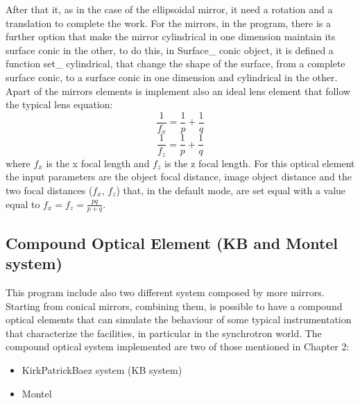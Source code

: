 %
After that it, as in the case of the ellipsoidal mirror, it need a rotation and a translation to complete the work.
For the mirrors, in the program, there is a further option that make the mirror cylindrical in one dimension maintain its surface conic in the other, to do this, in Surface\_ conic object, it is defined a function set\_ cylindrical, that change the shape of the surface, from a complete surface conic, to a surface conic in one dimension and cylindrical in the other.
\\
Apart of the mirrors elements is implement also an ideal lens element that follow the typical lens equation:
\begin{equation}
		\frac{1}{f_x} = \frac{1}{p} + \frac{1}{q}
		\label{eq: lens equation1}
\end{equation}
\begin{equation}
		\frac{1}{f_z} = \frac{1}{p} + \frac{1}{q}
		\label{eq: lens equation2}
\end{equation}
where $f_x $ is the x focal length and $f_z $ is the z focal length. For this optical element the input parameters are the object focal distance, image object distance and the two focal distances ($f_x $, $f_z $) that, in the default mode, are set equal with a value equal to $f_x = f_z = \frac{pq}{p+q} $.

\subsection{Compound Optical Element (KB and Montel system)}

This program include also two different system composed by more mirrors. Starting from conical mirrors, combining them, is possible to have a compound optical elements that can simulate the behaviour of some typical instrumentation that characterize the facilities, in particular in the synchrotron world. The compound optical system implemented are two of those mentioned in Chapter 2:
\begin{itemize}
\item KirkPatrickBaez system (KB system)
\item Montel
\end{itemize}

